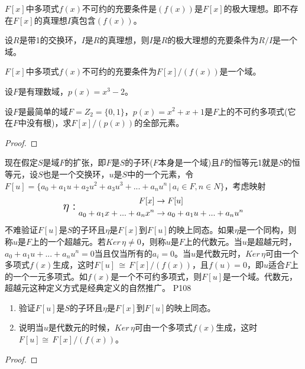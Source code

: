 \begin{lemma}
	$F[x]$中多项式$f(x)$不可约的充要条件是$(f(x))$是$F[x]$的极大理想。即不存在$F[x]$的真理想$I$真包含$(f(x))$。
\end{lemma}

\begin{lemma}
	设$R$是带1的交换环，$I$是$R$的真理想，则$I$是$R$的极大理想的充要条件为$R/I$是一个域。
\end{lemma}

\begin{corollary}
	$F[x]$中多项式$f(x)$不可约的充要条件为$F[x]/(f(x))$是一个域。
\end{corollary}

\begin{example}
	设$F$是有理数域，$p(x)=x^{3}-2$。
\end{example}

\begin{example}
	设$F$是最简单的域$F=Z_{2}=\{0,1\}$，$p(x)=x^{2}+x+1$是$F$上的不可约多项式(它在$F$中没有根)，求$F[x]/(p(x))$的全部元素。
\end{example}
\begin{proof}
	
\end{proof}

\original
{
	现在假定$S$是域$F$的扩张，即$F$是$S$的子环($F$本身是一个域)且$F$的恒等元1就是$S$的恒等元，设$S$也是一个交换环，$u$是$S$中的一个元素，令$F[u]=\{a_{0}+a_{1}u+a_{2}u^{2}+a_{3}u^{3}+...+a_{n}u^{n}\,\big| \, a_{i}\in F,n\in N\}$，考虑映射
	\begin{equation*}
		\text{\Large $\eta:$}\,\,
		\begin{aligned}
			F[x]&\rightarrow F[u]\\
			a_{0}+a_{1}x+...+a_{n}x^{n}&\rightarrow a_{0}+a_{1}u+...+a_{n}u^{n}
		\end{aligned}
	\end{equation*}
不难验证$F[u]$是$S$的子环且$\eta$是$F[x]$到$F[u]$的映上同态。如果$\eta$是一个同构，则称$u$是$F$上的一个超越元。若$Ker \, \eta \neq 0$，则称$u$是$F$上的代数元。当$u$是超越元时，$a_{0}+a_{1}u+...+a_{n}u^{n}=0$当且仅当所有的$a_{i}=0$。当$u$是代数元时，$Ker \, \eta$可由一个多项式$f(x)$生成，这时$F[u]\,\cong\, F[x]/(f(x))$，且$f(u)=0$，即$u$适合$F$上的一个一元多项式。如$f(x)$是一个不可约多项式，则$F[u]$是一个域。代数元，超越元这种定义方式是经典定义的自然推广。
}{P108}
\begin{proposition}
	\begin{enumerate}
		\item 验证$F[u]$是$S$的子环且$\eta$是$F[x]$到$F[u]$的映上同态。
		\item 说明当$u$是代数元的时候，$Ker\, \eta$可由一个多项式$f(x)$生成，这时$F[u]\cong \, F[x]/(f(x))$。
	\end{enumerate}
\end{proposition}
\begin{proof}
	
\end{proof}

